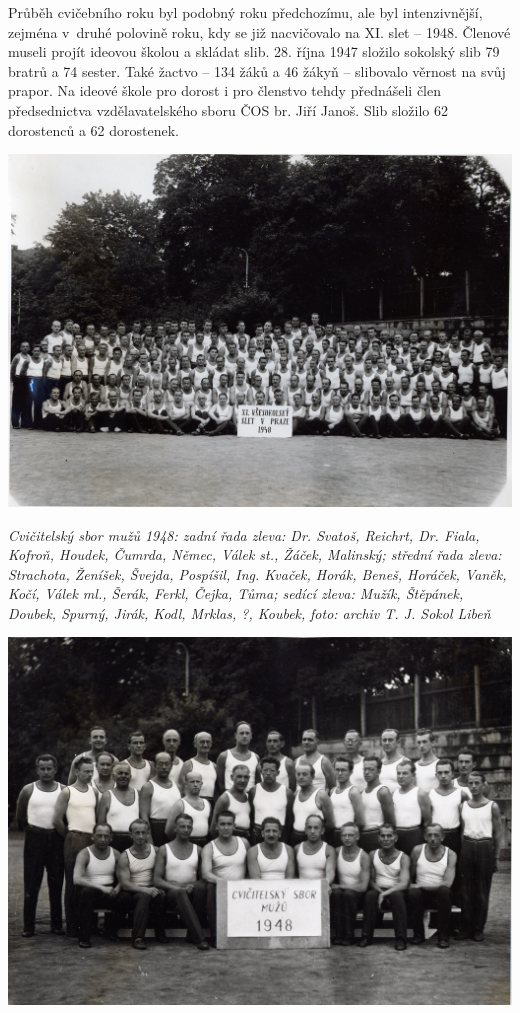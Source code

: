 \documentclass[a5paper, 11pt, twoside]{article}
\begin{document}
Průběh cvičebního roku byl podobný roku předchozímu, ale byl
intenzivnější, zejména v~druhé polovině roku, kdy se již nacvičovalo na
XI. slet -- 1948. Členové museli projít ideovou školou a skládat slib.
28. října 1947 složilo sokolský slib 79 bratrů a 74 sester. Také žactvo
-- 134 žáků a 46 žákyň -- slibovalo věrnost na svůj prapor. Na ideové
škole pro dorost i pro členstvo tehdy přednášeli člen předsednictva
vzdělavatelského sboru ČOS br. Jiří Janoš. Slib složilo 62 dorostenců a
62 dorostenek.

 \includegraphics[width=\textwidth]{img/31_muzi_cvicitele.jpg}

\textit{Cvičitelský sbor mužů 1948: zadní řada zleva: Dr. Svatoš, Reichrt,
Dr. Fiala, Kofroň, Houdek, Čumrda, Němec, Válek st., Žáček, Malinský;
střední řada zleva: Strachota, Ženíšek, Švejda, Pospíšil, Ing. Kvaček,
Horák, Beneš, Horáček, Vaněk, Kočí, Válek ml., Šerák, Ferkl, Čejka,
Tůma; sedící zleva: Mužík, Štěpánek, Doubek, Spurný, Jirák, Kodl,
Mrklas, ?, Koubek,} \textit{foto: archiv T. J. Sokol Libeň}

 \includegraphics[width=\textwidth]{img/32_muzi_cvicitele.jpg}
\end{document}
